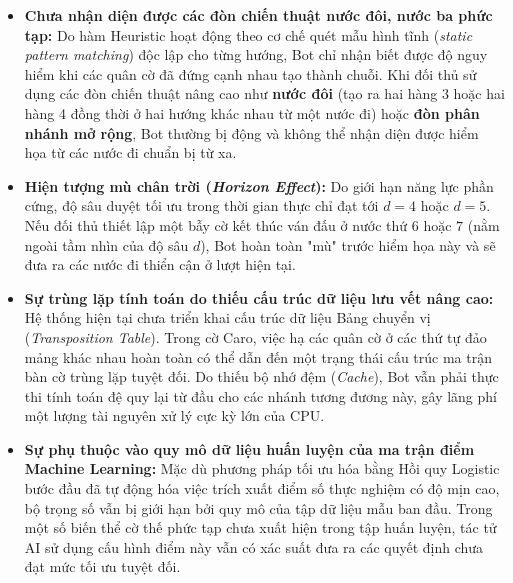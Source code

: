 \begin{itemize}
	\item \textbf{Chưa nhận diện được các đòn chiến thuật nước đôi, nước ba phức tạp:} Do hàm Heuristic hoạt động theo cơ chế quét mẫu hình tĩnh (\textit{static pattern matching}) độc lập cho từng hướng, Bot chỉ nhận biết được độ nguy hiểm khi các quân cờ đã đứng cạnh nhau tạo thành chuỗi. Khi đối thủ sử dụng các đòn chiến thuật nâng cao như \textbf{nước đôi} (tạo ra hai hàng 3 hoặc hai hàng 4 đồng thời ở hai hướng khác nhau từ một nước đi) hoặc \textbf{đòn phân nhánh mở rộng}, Bot thường bị động và không thể nhận diện được hiểm họa từ các nước đi chuẩn bị từ xa.
	
	\item \textbf{Hiện tượng mù chân trời (\textit{Horizon Effect}):} Do giới hạn năng lực phần cứng, độ sâu duyệt tối ưu trong thời gian thực chỉ đạt tới $d = 4$ hoặc $d = 5$. Nếu đối thủ thiết lập một bẫy cờ kết thúc ván đấu ở nước thứ $6$ hoặc $7$ (nằm ngoài tầm nhìn của độ sâu $d$), Bot hoàn toàn "mù" trước hiểm họa này và sẽ đưa ra các nước đi thiển cận ở lượt hiện tại.
	
	\item \textbf{Sự trùng lặp tính toán do thiếu cấu trúc dữ liệu lưu vết nâng cao:} Hệ thống hiện tại chưa triển khai cấu trúc dữ liệu Bảng chuyển vị (\textit{Transposition Table}). Trong cờ Caro, việc hạ các quân cờ ở các thứ tự đảo mảng khác nhau hoàn toàn có thể dẫn đến một trạng thái cấu trúc ma trận bàn cờ trùng lặp tuyệt đối. Do thiếu bộ nhớ đệm (\textit{Cache}), Bot vẫn phải thực thi tính toán đệ quy lại từ đầu cho các nhánh tương đương này, gây lãng phí một lượng tài nguyên xử lý cực kỳ lớn của CPU.
	
	\item \textbf{Sự phụ thuộc vào quy mô dữ liệu huấn luyện của ma trận điểm Machine Learning:} Mặc dù phương pháp tối ưu hóa bằng Hồi quy Logistic bước đầu đã tự động hóa việc trích xuất điểm số thực nghiệm có độ mịn cao, bộ trọng số vẫn bị giới hạn bởi quy mô của tập dữ liệu mẫu ban đầu. Trong một số biến thể cờ thế phức tạp chưa xuất hiện trong tập huấn luyện, tác tử AI sử dụng cấu hình điểm này vẫn có xác suất đưa ra các quyết định chưa đạt mức tối ưu tuyệt đối.
\end{itemize}